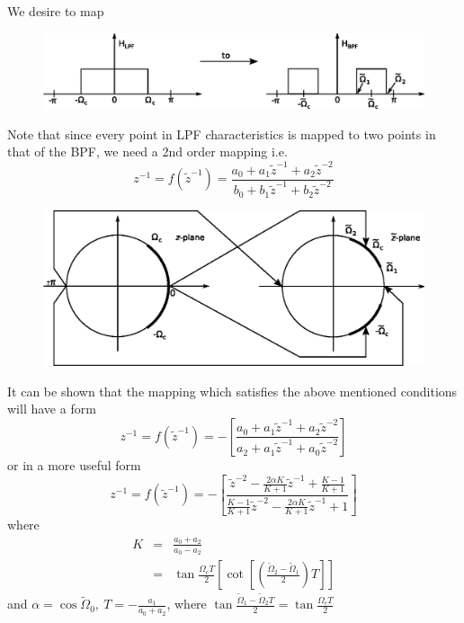 \documentclass [12pt]{article}   %
\begin{document}
\begin{enumerate}
	We desire to map
	\begin{figure}[H]
		\centering
		\includegraphics[width=5.5in]{LPFBPFmap.eps}
		\label{fig:transformation3}
	\end{figure}
	Note that since every point in LPF characteristics is mapped to two points in that of the BPF, we need a 2nd order mapping i.e.
	\begin{equation}
		z^{-1} = f(\tilde{z}^{-1}) = \frac{a_0 + a_1 \tilde{z}^{-1}+a_2 \tilde{z}^{-2}}{b_0 + b_1 \tilde{z}^{-1}+b_2 \tilde{z}^{-2}}
	\end{equation}
	\begin{figure}[H]
		\centering
		\includegraphics[width=5in]{LPFBPFunitmap.eps}
		\label{fig:transformation3unit}
	\end{figure}
	It can be shown that the mapping which satisfies the above mentioned conditions will have a form
	\begin{equation}
		z^{-1}=f(\tilde{z}^{-1})=-\left[\frac{a_0+a_1 \tilde{z}^{-1} + a_2 \tilde{z}^{-2}}{a_2 + a_1 \tilde{z}^{-1}+a_0 \tilde{z}^{-2}}\right]
	\end{equation}
	or in a more useful form
	\begin{equation}
		z^{-1} = f(\tilde{z}^{-1}) = -\left[\frac{\tilde{z}^{-2} - \frac{2\alpha K}{K + 1}\tilde{z}^{-1} + \frac{K-1}{K+1}}{\frac{K-1}{K+1}\tilde{z}^{-2}-\frac{2\alpha K}{K+1}\tilde{z}^{-1}+1}\right]
	\end{equation}
	where
	\begin{eqnarray} \nonumber
		K & = & \frac{a_0 + a_2}{a_0 - a_2} \\
		  & = & \tan \frac{\Omega_c T}{2} \left[\cot \left[\left(\frac{\tilde{\Omega}_2 - \tilde{\Omega}_1}{2}\right)T\right]\right]
	\end{eqnarray}
	and $\alpha = \cos \tilde{\Omega}_0,~T= -\frac{a_1}{a_0+a_2}$, where $\tan \frac{\tilde{\Omega}_1-\tilde{\Omega}_2 T}{2} = \tan \frac{\Omega_c T}{2}$
	

\end{enumerate}
\end{document}
